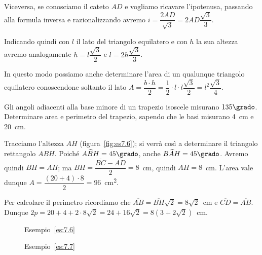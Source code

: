 Viceversa, se conosciamo il cateto $AD$ e vogliamo ricavare 
l'ipotenusa, passando alla formula inversa e razionalizzando avremo 
$i=\dfrac{2AD}{\sqrt{3}}=2AD\dfrac{\sqrt{3}}{3}$.

Indicando quindi con $l$ il lato del triangolo equilatero e con $h$ 
la sua altezza avremo analogamente $h=l\dfrac{\sqrt{3}}{2}$ e 
$l=2h\dfrac{\sqrt{3}}{3}$.

In questo modo possiamo anche determinare l'area di un qualunque 
triangolo equilatero conoscendone soltanto il lato $A=\dfrac{b\cdot 
h}{2}=\dfrac{1}{2}\cdot l\cdot 
l\dfrac{\sqrt{3}}{2}=l^2\dfrac{\sqrt{3}}{4}$.

\begin{esempio}\label{es:7.6}
Gli angoli adiacenti alla base minore di un trapezio isoscele 
misurano $135\grado$. Determinare area e perimetro del trapezio, 
sapendo che le basi misurano 4~cm e 20~cm.\vspace{7pt}

Tracciamo l'altezza $AH$ (figura~\ref{fig:es7.6}); si verrà così a 
determinare il triangolo rettangolo $ABH$. Poiché 
$A\widehat{B}H=45\grado$, anche $B\widehat{A}H=45\grado$. Avremo 
quindi $\overline{BH}=\overline{AH}$; ma 
$\overline{BH}=\dfrac{\overline{BC}-\overline{AD}}{2}=8$~cm, quindi 
$\overline{AH}=8$~cm. L'area vale dunque $A=\dfrac{(20+4)\cdot 
8}{2}=96$~cm\textsuperscript{2}.

Per calcolare il perimetro ricordiamo che 
$\overline{AB}=\overline{BH}\sqrt{2}=8\sqrt{2}$~cm e 
$\overline{CD}=\overline{AB}$.
Dunque $2p=20+4+2\cdot 8\sqrt{2}=24+16\sqrt{2}=8(3+2\sqrt{2})$~cm.
\end{esempio}

\vspace{-2em}

\begin{inaccessibleblock}
 \begin{figure}[!htb]
  \begin{center}
    \begin{minipage}{0.45\textwidth}
      \centering
      
      
\caption{Esempio~\ref{es:7.6}}\label{fig:es7.6}
    \end{minipage}
    \hspace{0.03\textwidth}  
    \begin{minipage}{0.45\textwidth}
      \centering
      
      
\caption{Esempio~\ref{es:7.7}}\label{fig:es7.7}
    \end{minipage}
  \end{center}
\end{figure}
\end{inaccessibleblock}

